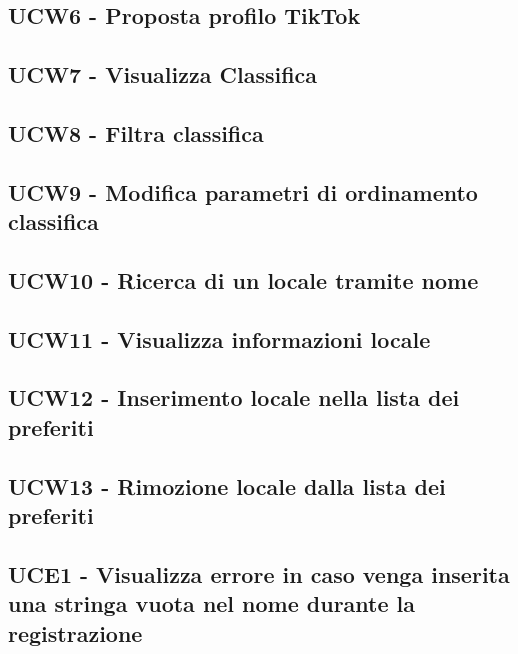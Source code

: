 \documentclass[a4paper]{article}
\begin{document}
	\subsection{UCW6 - Proposta profilo TikTok}
	
	
	\subsection{UCW7 - Visualizza Classifica}
	
	
	\subsection{UCW8 - Filtra classifica}
	
	
	\subsection{UCW9 - Modifica parametri di ordinamento classifica}
	
	
	\subsection{UCW10 - Ricerca di un locale tramite nome}
	
	
	\subsection{UCW11 - Visualizza informazioni locale}
	
	
	\subsection{UCW12 - Inserimento locale nella lista dei preferiti}
	
	
	\subsection{UCW13 - Rimozione locale dalla lista dei preferiti}
	
	
	\newpage

	\subsection{UCE1 - Visualizza errore in caso venga inserita una stringa vuota nel nome durante la registrazione}
	
\end{document}
